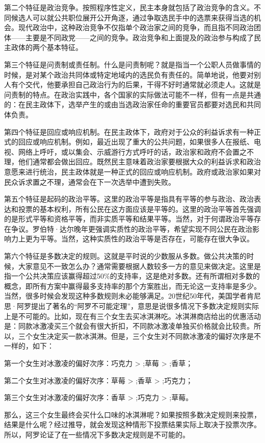 第二个特征是政治竞争。按照程序性定义，民主本身就包括了政治竞争的含义。不同候选人可以就公共职位展开公开角逐，通过争取选民手中的选票来获得当选的机会。现代政治中，这种政治竞争不仅指单个政治家之间的竞争，而且指不同政治团体——主要是不同政党——之间的竞争。政治竞争和上面提及的政治参与构成了民主政体的两个基本特征。

第三个特征是问责制或责任制。什么是问责制呢？就是指当一个公职人员做事情的时候，是对某个政治共同体或特定地域内的选民负有责任的。简单地说，他要对别人有个交代，他要承担自己政治行为的后果，干得不好时通常就必须走人。这就是问责制的特点。在政治实践中，各个国家的实际做法可能不一样，但有一点是共通的：在民主政体下，选举产生的或由当选政治家任命的重要官员都要对选民和共同体负责。

第四个特征是回应或响应机制。在民主政体下，政府对于公众的利益诉求有一种正式的回应或响应机制。例如，最近出现了重大的公共问题，如果很多人在报纸、电视、网络上呼吁，或以集会、示威游行方式呼吁的话，政治家和政府不会置之不理，他们通常都会做出回应。既然民主意味着政治家要根据大众的利益诉求和政治意愿来进行统治，民主政体就是一种正式的回应或响应机制。政府或政治家如果对民众诉求置之不理，通常会在下一次选举中遭到失败。

第五个特征是起码的政治平等。这里的政治平等是指具有平等的参与政治、政治表达和投票的基本权利，所有公民在这方面应该是平等的。这里的政治平等首先强调的是形式平等和资格平等，而非实质平等和结果平等。当然，对于何谓政治平等存在争议。罗伯特·达尔晚年更强调实质性的政治平等，希望实现不同公民在政治影响力上更为平等。当然，这种实质性的政治平等是否存在，可能存在很大争议。

第六个特征是多数决定的规则。这就是平时说的少数服从多数。做公共决策的时候，大家意见不一致怎么办？通常需要根据人数较多一方的意见来做决定。这里是指一个公共决策应该赢得超过50\%的支持率，这是绝对多数。还有所谓相对多数的概念，即所有方案中赢得最多支持率的那个方案胜出，而无论这一支持率是多少。当然，很多时候会发现这种多数规则未必能够满足。20世纪50年代，美国学者肯尼思·阿罗提出了著名的“阿罗不可能定理”，意思是说很多情况下多数决定规则实际上是不可能的。比如，现在有三个女生去买冰淇淋吃。冰淇淋商店给出的优惠活动是：同款冰激凌买三个就会有很大折扣，不同款冰激凌单独买价格就会比较贵。所以，三个女生决定买一款冰淇淋。但是，三个女生对不同款冰激凌的偏好次序是不一样的，如下：

第一个女生对冰激凌的偏好次序：巧克力 > ;草莓 > ;香草；

第二个女生对冰激凌的偏好次序：草莓 > ;香草 > ;巧克力；

第三个女生对冰激凌的偏好次序：香草 > ;巧克力 > ;草莓。

那么，这三个女生最终会买什么口味的冰淇淋呢？如果按照多数决定规则来投票，结果是什么呢？经过推导，就会发现这种情形下投票结果实际上取决于投票次序。所以，阿罗论证了在一些情况下多数决定规则是不可能的。

